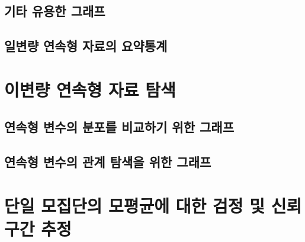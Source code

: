 \documentclass[
]{book}
\begin{document}
\hypertarget{uxae30uxd0c0-uxc720uxc6a9uxd55c-uxadf8uxb798uxd504}{%
\subsection{기타 유용한 그래프}\label{uxae30uxd0c0-uxc720uxc6a9uxd55c-uxadf8uxb798uxd504}}

\hypertarget{uxc77cuxbcc0uxb7c9-uxc5f0uxc18duxd615-uxc790uxb8ccuxc758-uxc694uxc57duxd1b5uxacc4}{%
\subsection{일변량 연속형 자료의 요약통계}\label{uxc77cuxbcc0uxb7c9-uxc5f0uxc18duxd615-uxc790uxb8ccuxc758-uxc694uxc57duxd1b5uxacc4}}

\hypertarget{uxc774uxbcc0uxb7c9-uxc5f0uxc18duxd615-uxc790uxb8cc-uxd0d0uxc0c9}{%
\section{이변량 연속형 자료 탐색}\label{uxc774uxbcc0uxb7c9-uxc5f0uxc18duxd615-uxc790uxb8cc-uxd0d0uxc0c9}}

\hypertarget{uxc5f0uxc18duxd615-uxbcc0uxc218uxc758-uxbd84uxd3ecuxb97c-uxbe44uxad50uxd558uxae30-uxc704uxd55c-uxadf8uxb798uxd504}{%
\subsection{연속형 변수의 분포를 비교하기 위한 그래프}\label{uxc5f0uxc18duxd615-uxbcc0uxc218uxc758-uxbd84uxd3ecuxb97c-uxbe44uxad50uxd558uxae30-uxc704uxd55c-uxadf8uxb798uxd504}}

\hypertarget{uxc5f0uxc18duxd615-uxbcc0uxc218uxc758-uxad00uxacc4-uxd0d0uxc0c9uxc744-uxc704uxd55c-uxadf8uxb798uxd504}{%
\subsection{연속형 변수의 관계 탐색을 위한 그래프}\label{uxc5f0uxc18duxd615-uxbcc0uxc218uxc758-uxad00uxacc4-uxd0d0uxc0c9uxc744-uxc704uxd55c-uxadf8uxb798uxd504}}

\hypertarget{uxb2e8uxc77c-uxbaa8uxc9d1uxb2e8uxc758-uxbaa8uxd3c9uxade0uxc5d0-uxb300uxd55c-uxac80uxc815-uxbc0f-uxc2e0uxb8b0uxad6cuxac04-uxcd94uxc815}{%
\section{단일 모집단의 모평균에 대한 검정 및 신뢰구간 추정}\label{uxb2e8uxc77c-uxbaa8uxc9d1uxb2e8uxc758-uxbaa8uxd3c9uxade0uxc5d0-uxb300uxd55c-uxac80uxc815-uxbc0f-uxc2e0uxb8b0uxad6cuxac04-uxcd94uxc815}}
\end{document}
